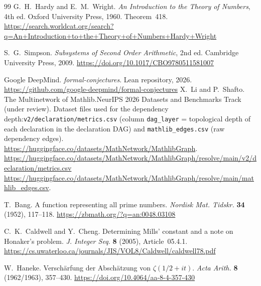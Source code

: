 \documentclass[11pt,reqno]{amsart}
\theoremstyle{blueplain}
\numberwithin{equation}{section}
\def\hyperlink#1#2{#2}}
\begin{document}
\begin{thebibliography}{99}
	G.~H.~Hardy and E.~M.~Wright.
	\emph{An Introduction to the Theory of Numbers}, 4th ed.
	Oxford University Press, 1960. Theorem~418.
	\url{https://search.worldcat.org/search?q=An+Introduction+to+the+Theory+of+Numbers+Hardy+Wright}
	
	S.~G.~Simpson.
	\emph{Subsystems of Second Order Arithmetic}, 2nd ed.
	Cambridge University Press, 2009.
	\url{https://doi.org/10.1017/CBO9780511581007}
	
	Google DeepMind.
	\emph{formal-conjectures}.
	Lean repository, 2026.
	\url{https://github.com/google-deepmind/formal-conjectures}
	\hypertarget{abbr-source:MathlibGraph}{} X.~Li and P.~Shafto. The Multinetwork of
Mathlib.\newline \hyperlink{abbr:NeurIPS}{NeurIPS} 2026 Datasets and Benchmarks Track (under review).\newline
Dataset files used for the dependency depth:\newline \texttt{v2/declaration/metrics.csv}
(column \texttt{dag\_layer} = topological depth of each declaration in the
declaration \hyperlink{abbr:DAG}{DAG}) and \texttt{mathlib\_edges.csv} (raw dependency edges).\newline
{\scriptsize
	\url{https://huggingface.co/datasets/MathNetwork/MathlibGraph}.\newline
	\url{https://huggingface.co/datasets/MathNetwork/MathlibGraph/resolve/main/v2/declaration/metrics.csv}\newline
	\url{https://huggingface.co/datasets/MathNetwork/MathlibGraph/resolve/main/mathlib_edges.csv}.}

	\hypertarget{abbr-source:Bang1952}{}
	T.~Bang.
	A function representing all prime numbers.
	\hyperlink{abbr:journal-Nordisk-Mat-Tidskr}{\emph{Nordisk Mat. Tidskr.}} \textbf{34} (1952), 117--118.
	\url{https://zbmath.org/?q=an:0048.03108}
	
	\hypertarget{abbr-source:CaldwellCheng2005}{}
	C.~K.~Caldwell and Y.~Cheng.
	Determining Mills' constant and a note on Honaker's problem.
	\hyperlink{abbr:journal-J-Integer-Seq}{\emph{J. Integer Seq.}} \textbf{8} (2005), Article~05.4.1.
	\url{https://cs.uwaterloo.ca/journals/JIS/VOL8/Caldwell/caldwell78.pdf}
	
	\hypertarget{abbr-source:Haneke1962}{}
	W.~Haneke.
	Versch\"arfung der Absch\"atzung von \(\zeta(1/2+it)\).
	\hyperlink{abbr:journal-Acta-Arith}{\emph{Acta Arith.}} \textbf{8} (1962/1963), 357--430.
	\url{https://doi.org/10.4064/aa-8-4-357-430}
	

\end{thebibliography}
\end{document}
